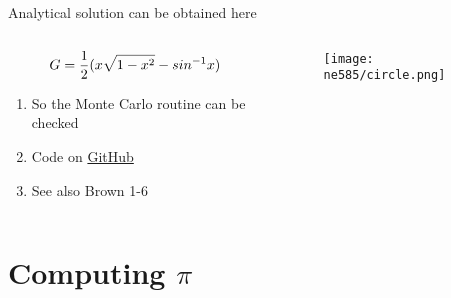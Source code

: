 \documentclass[aspectratio=1610,pdftex,dvipsnames,compress,xcolor={dvipsnames}]{beamer}
\begin{document}
\begin{frame}{Analytical solution can be obtained here}
    \begin{columns}[t]

        \begin{column}{0.55\textwidth}
            \begin{equation}
                \LARGE
                G = \frac{1}{2}(x\sqrt{1-x^2}-sin^{-1} x)
            \end{equation}

            \vspace*{\fill}
            
            \begin{enumerate}[series=outerlist,topsep=0pt,itemsep=21pt,leftmargin=*,label=(\arabic*)]
                \item[]So the Monte Carlo routine can be checked
                \item[]Code on \href{https://github.com/TheDoctorRAB/education/blob/master/src/monte.carlo.simple.py}{GitHub}
                \item[]See also Brown 1-6
            \end{enumerate}
        \end{column}

        \begin{column}{0.45\textwidth}
            \begin{figure}
                \centering
                \texttt{[image: ne585/circle.png]}
            \end{figure}
        \end{column}

    \end{columns}
\end{frame}


\section{Computing $\pi$}
\end{document}
